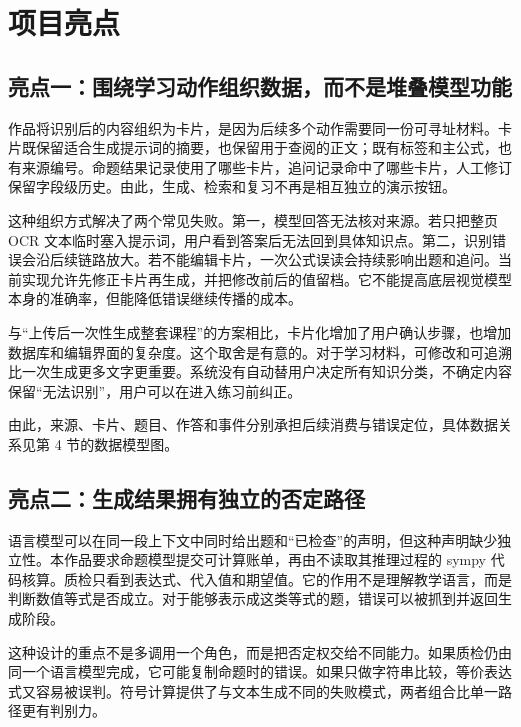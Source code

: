 \section{项目亮点}

\subsection{亮点一：围绕学习动作组织数据，而不是堆叠模型功能}

作品将识别后的内容组织为卡片，是因为后续多个动作需要同一份可寻址材料。卡片既保留适合生成提示词的摘要，也保留用于查阅的正文；既有标签和主公式，也有来源编号。命题结果记录使用了哪些卡片，追问记录命中了哪些卡片，人工修订保留字段级历史。由此，生成、检索和复习不再是相互独立的演示按钮。

这种组织方式解决了两个常见失败。第一，模型回答无法核对来源。若只把整页 OCR 文本临时塞入提示词，用户看到答案后无法回到具体知识点。第二，识别错误会沿后续链路放大。若不能编辑卡片，一次公式误读会持续影响出题和追问。当前实现允许先修正卡片再生成，并把修改前后的值留档。它不能提高底层视觉模型本身的准确率，但能降低错误继续传播的成本。

与“上传后一次性生成整套课程”的方案相比，卡片化增加了用户确认步骤，也增加数据库和编辑界面的复杂度。这个取舍是有意的。对于学习材料，可修改和可追溯比一次生成更多文字更重要。系统没有自动替用户决定所有知识分类，不确定内容保留“无法识别”，用户可以在进入练习前纠正。

由此，来源、卡片、题目、作答和事件分别承担后续消费与错误定位，具体数据关系见第 4 节的数据模型图。

\subsection{亮点二：生成结果拥有独立的否定路径}

语言模型可以在同一段上下文中同时给出题和“已检查”的声明，但这种声明缺少独立性。本作品要求命题模型提交可计算账单，再由不读取其推理过程的 sympy 代码核算。质检只看到表达式、代入值和期望值。它的作用不是理解教学语言，而是判断数值等式是否成立。对于能够表示成这类等式的题，错误可以被抓到并返回生成阶段。

这种设计的重点不是多调用一个角色，而是把否定权交给不同能力。如果质检仍由同一个语言模型完成，它可能复制命题时的错误。如果只做字符串比较，等价表达式又容易被误判。符号计算提供了与文本生成不同的失败模式，两者组合比单一路径更有判别力。

